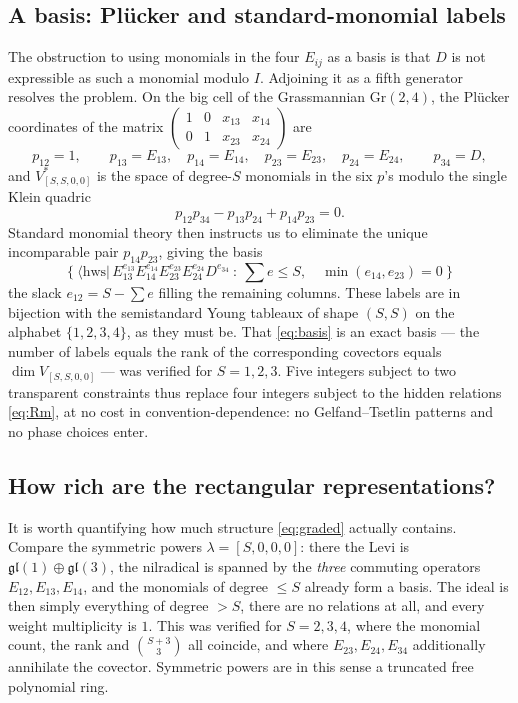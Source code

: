 \documentclass[12pt]{article}
\newcommand{\hws}{\mathrm{hws}}
\newcommand{\gl}{\mathfrak{gl}}
\newcommand{\Gr}{\mathrm{Gr}}
\begin{document}
\subsection{A basis: Pl\"ucker and standard-monomial labels}

The obstruction to using monomials in the four $E_{ij}$ as a basis is that $D$ is
not expressible as such a monomial modulo $I$. Adjoining it as a fifth generator
resolves the problem. On the big cell of the Grassmannian $\Gr(2,4)$, the
Pl\"ucker coordinates of the matrix
$\left(\begin{smallmatrix}1&0&x_{13}&x_{14}\\0&1&x_{23}&x_{24}\end{smallmatrix}\right)$
are
\begin{equation}
p_{12}=1,\qquad p_{13}=E_{13},\quad p_{14}=E_{14},\quad
p_{23}=E_{23},\quad p_{24}=E_{24},\qquad p_{34}=D ,
\end{equation}
and $V_{[S,S,0,0]}^*$ is the space of degree-$S$ monomials in the six $p$'s
modulo the single Klein quadric
\begin{equation}
p_{12}p_{34}-p_{13}p_{24}+p_{14}p_{23}=0 .
\label{eq:klein}
\end{equation}
Standard monomial theory then instructs us to eliminate the unique incomparable
pair $p_{14}p_{23}$, giving the basis
\begin{equation}
\boxed{\ \
\Big\{\ \langle\hws|\,E_{13}^{e_{13}}E_{14}^{e_{14}}E_{23}^{e_{23}}E_{24}^{e_{24}}D^{e_{34}}
\ :\ \textstyle\sum e\leq S,\quad \min(e_{14},e_{23})=0\ \Big\}
\ \ }
\label{eq:basis}
\end{equation}
the slack $e_{12}=S-\sum e$ filling the remaining columns. These labels are in
bijection with the semistandard Young tableaux of shape $(S,S)$ on the alphabet
$\{1,2,3,4\}$, as they must be. That \eqref{eq:basis} is an exact basis --- the
number of labels equals the rank of the corresponding covectors equals
$\dim V_{[S,S,0,0]}$ --- was verified for $S=1,2,3$. Five integers subject to two
transparent constraints thus replace four integers subject to the hidden
relations \eqref{eq:Rm}, at no cost in convention-dependence: no
Gelfand--Tsetlin patterns and no phase choices enter.

\subsection{How rich are the rectangular representations?}

It is worth quantifying how much structure \eqref{eq:graded} actually contains.
Compare the symmetric powers $\lambda=[S,0,0,0]$: there the Levi is
$\gl(1)\oplus\gl(3)$, the nilradical is spanned by the \emph{three} commuting
operators $E_{12},E_{13},E_{14}$, and the monomials of degree $\leq S$ already
form a basis. The ideal is then simply everything of degree $>S$, there are no
relations at all, and every weight multiplicity is $1$. This was verified for
$S=2,3,4$, where the monomial count, the rank and $\binom{S+3}{3}$ all coincide,
and where $E_{23},E_{24},E_{34}$ additionally annihilate the covector. Symmetric
powers are in this sense a truncated free polynomial ring.
\end{document}
